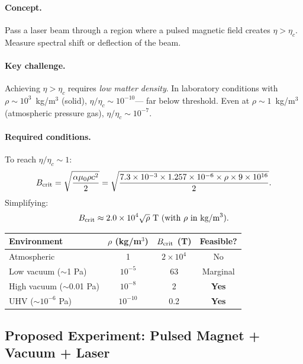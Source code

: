 \documentclass[12pt,a4paper]{article}
\theoremstyle{remark}
\begin{document}
\paragraph{Concept.}
Pass a laser beam through a region where a pulsed magnetic field creates
$\eta > \eta_c$. Measure spectral shift or deflection of the beam.

\paragraph{Key challenge.}
Achieving $\eta > \eta_c$ requires \emph{low matter density}. In laboratory
conditions with $\rho \sim 10^3$~kg/m$^3$ (solid), $\eta/\eta_c \sim 10^{-10}$---
far below threshold. Even at $\rho \sim 1$~kg/m$^3$ (atmospheric pressure gas),
$\eta/\eta_c \sim 10^{-7}$.

\paragraph{Required conditions.}
To reach $\eta/\eta_c \sim 1$:
\begin{equation}
B_{\rm crit} = \sqrt{\frac{\alpha \mu_0 \rho c^2}{2}}
= \sqrt{\frac{7.3 \times 10^{-3} \times 1.257 \times 10^{-6} \times \rho \times 9 \times 10^{16}}{2}}.
\end{equation}
Simplifying:
\begin{equation}
B_{\rm crit} \approx 2.0 \times 10^4 \sqrt{\rho}~\text{T (with $\rho$ in kg/m$^3$)}.
\end{equation}

\begin{center}
\begin{tabular}{lccc}
\toprule
Environment & $\rho$ (kg/m$^3$) & $B_{\rm crit}$ (T) & Feasible? \\
\midrule
Atmospheric & 1 & $2 \times 10^4$ & No \\
Low vacuum ($\sim$1 Pa) & $10^{-5}$ & 63 & Marginal \\
High vacuum ($\sim$0.01 Pa) & $10^{-8}$ & 2 & \textbf{Yes} \\
UHV ($\sim 10^{-6}$ Pa) & $10^{-10}$ & 0.2 & \textbf{Yes} \\
\bottomrule
\end{tabular}
\end{center}

\subsection{Proposed Experiment: Pulsed Magnet + Vacuum + Laser}
\end{document}

